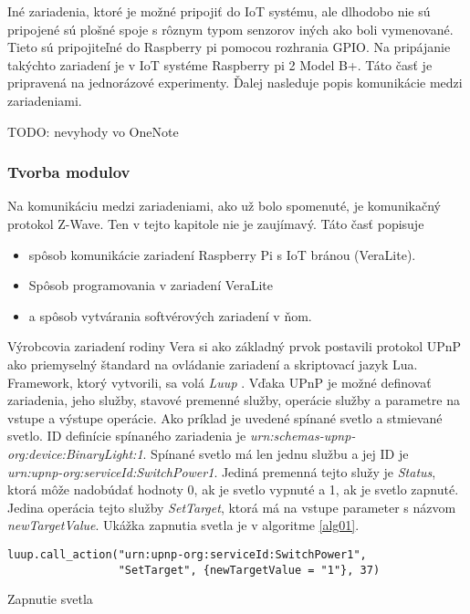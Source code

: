 \indent Iné zariadenia, ktoré je možné pripojiť do IoT systému, ale dlhodobo nie sú pripojené sú plošné spoje s rôznym typom senzorov iných ako boli vymenované. Tieto sú pripojiteľné do Raspberry pi pomocou rozhrania GPIO. Na pripájanie takýchto zariadení je v IoT systéme Raspberry pi 2 Model B+. Táto časť je pripravená na jednorázové experimenty. Ďalej nasleduje popis komunikácie medzi zariadeniami.  

TODO: nevyhody vo OneNote

\subsubsection{Tvorba modulov}
Na komunikáciu medzi zariadeniami, ako už bolo spomenuté, je komunikačný protokol Z-Wave. Ten v tejto kapitole nie je zaujímavý. Táto časť popisuje 
\begin{itemize}
  \item spôsob komunikácie zariadení Raspberry Pi s IoT bránou (VeraLite).
  \item  Spôsob programovania v zariadení VeraLite   
  \item  a spôsob vytvárania softvérových zariadení v ňom.   
\end{itemize} 
Výrobcovia zariadení rodiny Vera si ako základný prvok postavili protokol UPnP ako priemyselný štandard na ovládanie zariadení a skriptovací jazyk Lua. Framework, ktorý vytvorili, sa volá \textit{Luup} \cite{IOT28}. 
\indent Vďaka UPnP je možné definovať zariadenia, jeho služby, stavové premenné služby, operácie služby a parametre na vstupe a výstupe operácie. Ako príklad je uvedené spínané svetlo a stmievané svetlo. ID definície spínaného zariadenia je \textit{urn:schemas-upnp-org:device:BinaryLight:1}. Spínané svetlo má len jednu službu a jej ID je \textit{urn:upnp-org:serviceId:SwitchPower1}. Jediná premenná tejto služy je \textit{Status}, ktorá môže nadobúdať hodnoty 0, ak je svetlo vypnuté a 1, ak je svetlo zapnuté. Jedina operácia tejto služby \textit{SetTarget}, ktorá má na vstupe parameter s názvom \textit{newTargetValue}. Ukážka zapnutia svetla je v algoritme \ref{alg01}. 
\begin{algorithm}
%
\begin{lstlisting}
luup.call_action("urn:upnp-org:serviceId:SwitchPower1",
                 "SetTarget", {newTargetValue = "1"}, 37)
\end{lstlisting}
 \caption{Zapnutie svetla}
 \label{alg01}
\end{algorithm}

